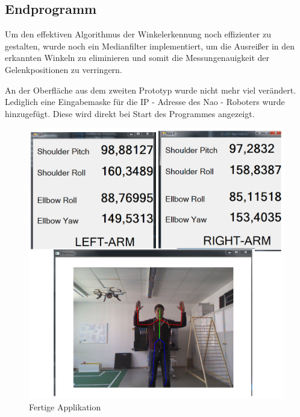 \subsection{Endprogramm}
Um den effektiven Algorithmus der Winkelerkennung noch effizienter zu gestalten, wurde noch ein Medianfilter implementiert, um die Ausreißer in den erkannten Winkeln zu eliminieren und somit die Messungenauigkeit der Gelenkpositionen zu verringern.

An der Oberfläche aus dem zweiten Prototyp wurde nicht mehr viel verändert. Lediglich eine Eingabemaske für die IP - Adresse des Nao - Roboters wurde hinzugefügt. Diese wird direkt bei Start des Programmes angezeigt.

\begin{figure}[H]						
	\centering							
	\includegraphics[scale=0.4]{Bilder/Programm.png}
	\caption{Fertige Applikation}						
	\label{f:programm}						
\end{figure}


